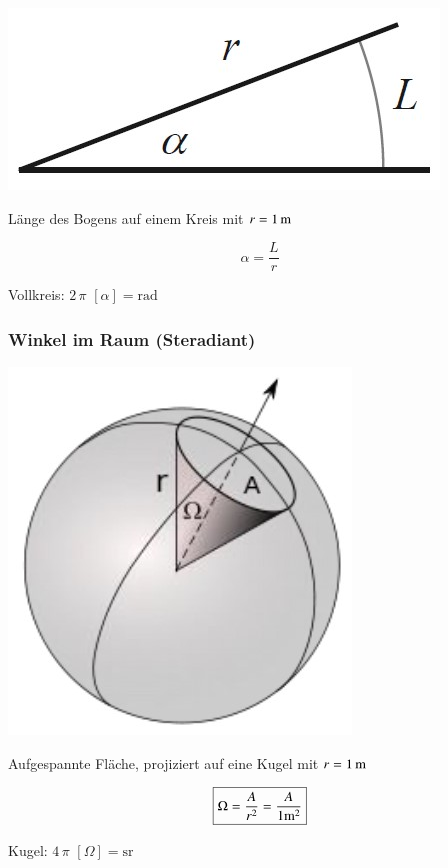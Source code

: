 \begin{minipage}{0.4\linewidth}
\includegraphics[width=\linewidth]{Bilder/Wellen-Optik/winkel_ebene}
\end{minipage}
\hfill
\begin{minipage}{0.48\linewidth}
Länge des Bogens auf einem Kreis mit $r = 1 \, \mathrm{m}$ 

$$ \boxed{ \alpha = \frac{L}{r}  } $$ 

Vollkreis: $2 \, \pi$ \qquad $[\alpha] = \mathrm{rad}$ 
\end{minipage}


\subsubsection{Winkel im Raum (Steradiant)}

\begin{minipage}{0.35\linewidth}
\includegraphics[width=\linewidth]{Bilder/Wellen-Optik/winkel_raum}
\end{minipage}
\hfill
\begin{minipage}{0.62\linewidth}
Aufgespannte Fläche, projiziert auf eine Kugel mit $r = 1 \, \mathrm{m}$

$$ \boxed{ \Omega = \frac{A}{r^2} = \frac{A}{1 \mathrm{m}^2} } $$

Kugel: $4 \, \pi$ \qquad $[\Omega] = \mathrm{sr}$ 
\end{minipage}

